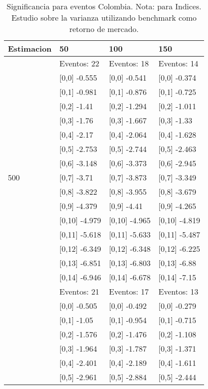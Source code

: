 \begin{table}

\caption{Significancia para eventos Colombia. Nota: para Indices. Estudio sobre la varianza utilizando benchmark como retorno de mercado.}
\centering
\begin{tabular}[t]{llll}
\toprule
Estimacion & 50 & 100 & 150\\
\midrule
 & Eventos:  22 & Eventos:  18 & Eventos:  14\\
 & {}[0,0] -0.555 & {}[0,0] -0.541 & {}[0,0] -0.374\\
 & {}[0,1] -0.981 & {}[0,1] -0.876 & {}[0,1] -0.725\\
 & {}[0,2] -1.41 & {}[0,2] -1.294 & {}[0,2] -1.011\\
 & {}[0,3] -1.76 & {}[0,3] -1.667 & {}[0,3] -1.33\\
\addlinespace
 & {}[0,4] -2.17 & {}[0,4] -2.064 & {}[0,4] -1.628\\
 & {}[0,5] -2.753 & {}[0,5] -2.744 & {}[0,5] -2.463\\
 & {}[0,6] -3.148 & {}[0,6] -3.373 & {}[0,6] -2.945\\
500 & {}[0,7] -3.71 & {}[0,7] -3.873 & {}[0,7] -3.349\\
 & {}[0,8] -3.822 & {}[0,8] -3.955 & {}[0,8] -3.679\\
\addlinespace
 & {}[0,9] -4.379 & {}[0,9] -4.41 & {}[0,9] -4.265\\
 & {}[0,10] -4.979 & {}[0,10] -4.965 & {}[0,10] -4.819\\
 & {}[0,11] -5.618 & {}[0,11] -5.633 & {}[0,11] -5.487\\
 & {}[0,12] -6.349 & {}[0,12] -6.348 & {}[0,12] -6.225\\
 & {}[0,13] -6.851 & {}[0,13] -6.803 & {}[0,13] -6.88\\
\addlinespace
 & {}[0,14] -6.946 & {}[0,14] -6.678 & {}[0,14] -7.15\\
 & Eventos:  21 & Eventos:  17 & Eventos:  13\\
 & {}[0,0] -0.505 & {}[0,0] -0.492 & {}[0,0] -0.279\\
 & {}[0,1] -1.05 & {}[0,1] -0.954 & {}[0,1] -0.715\\
 & {}[0,2] -1.576 & {}[0,2] -1.476 & {}[0,2] -1.108\\
\addlinespace
 & {}[0,3] -1.964 & {}[0,3] -1.787 & {}[0,3] -1.371\\
 & {}[0,4] -2.401 & {}[0,4] -2.189 & {}[0,4] -1.611\\
 & {}[0,5] -2.961 & {}[0,5] -2.884 & {}[0,5] -2.444\\

\end{tabular}
\end{table}
